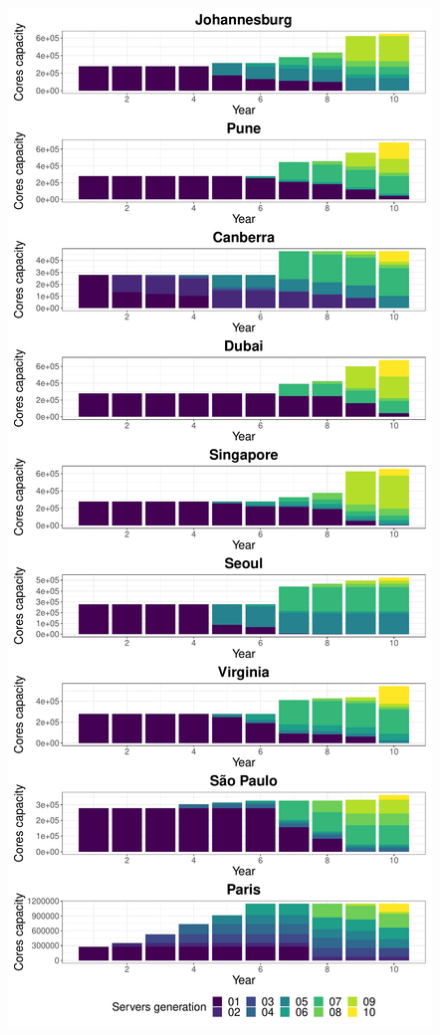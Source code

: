 \begin{figure}
\centering
\begin{minipage}{.5\textwidth}
  \centering
  \includegraphics[width=\linewidth]{images/dc_evolution_year_by_year.pdf}

\end{minipage}
\end{figure}
